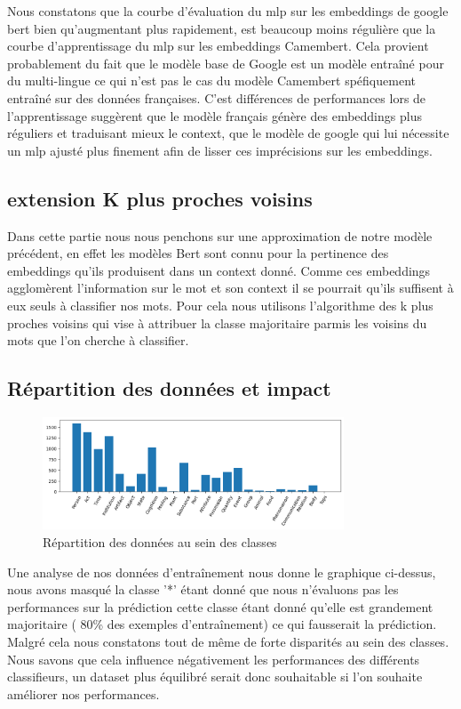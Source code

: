 \documentclass[12pt]{article}
\begin{document}
Nous constatons que la courbe d'évaluation  du mlp sur les embeddings de google bert bien qu'augmentant plus rapidement, est
beaucoup moins régulière que la courbe d'apprentissage du mlp sur les embeddings Camembert. Cela provient probablement du fait 
que le modèle base de Google est un modèle entraîné pour du multi-lingue ce qui n'est pas le cas du modèle Camembert spéfiquement 
entraîné sur des données françaises. C'est différences de performances lors de l'apprentissage suggèrent que le modèle français génère 
des embeddings plus réguliers et traduisant mieux le context, que le modèle de google qui lui nécessite un mlp ajusté plus finement afin 
de lisser ces imprécisions sur les embeddings.
\subsection{extension K plus proches voisins}

Dans cette partie nous nous penchons sur une approximation de notre modèle précédent, en effet les modèles Bert sont connu 
pour la pertinence des embeddings qu'ils produisent dans un context donné. Comme ces embeddings agglomèrent l'information sur 
le mot et son context il se pourrait qu'ils suffisent à eux seuls à classifier nos mots. Pour cela nous utilisons l'algorithme
des k plus proches voisins qui vise à attribuer la classe majoritaire parmis les voisins du mots que l'on cherche à classifier. 



\subsection{Répartition des données et impact}
\begin{figure}[H]
    \centering
    \includegraphics[width=0.8\textwidth]{static/data_rep.png}
    \caption{ Répartition des données au sein des classes}
\end{figure}
Une analyse de nos données d'entraînement nous donne le graphique ci-dessus, nous avons masqué la classe '*' étant donné que nous
n'évaluons pas les performances sur la prédiction cette classe étant donné qu'elle est grandement majoritaire ( 80\% des exemples d'entraînement) ce qui
fausserait la prédiction. Malgré cela nous constatons tout de même de forte disparités au sein des classes. Nous savons que cela 
influence négativement les performances des différents classifieurs, un dataset plus équilibré serait donc souhaitable si l'on souhaite améliorer
nos performances. 
\end{document}
